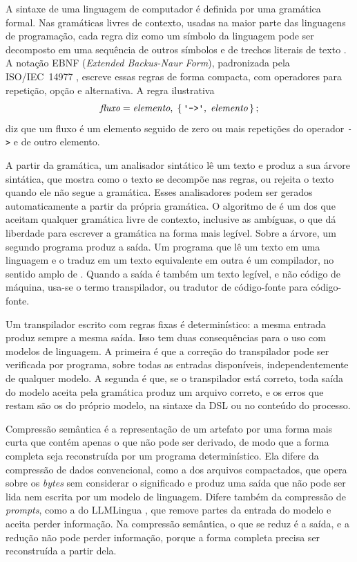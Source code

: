 A sintaxe de uma linguagem de computador é definida por uma gramática formal. Nas gramáticas livres de contexto, usadas na maior parte das linguagens de programação, cada regra diz como um símbolo da linguagem pode ser decomposto em uma sequência de outros símbolos e de trechos literais de texto \cite{aho2006compilers}. A notação EBNF (\textit{Extended Backus-Naur Form}), padronizada pela ISO/IEC~14977 \cite{iso1996ebnf}, escreve essas regras de forma compacta, com operadores para repetição, opção e alternativa. A regra ilustrativa
\begin{equation*}
	\textit{fluxo} = \textit{elemento}, \; \{\, \texttt{\textquotesingle{}->\textquotesingle{}}, \; \textit{elemento} \,\} \, ;
\end{equation*}
diz que um fluxo é um elemento seguido de zero ou mais repetições do operador \texttt{->} e de outro elemento.

A partir da gramática, um analisador sintático lê um texto e produz a sua árvore sintática, que mostra como o texto se decompõe nas regras, ou rejeita o texto quando ele não segue a gramática. Esses analisadores podem ser gerados automaticamente a partir da própria gramática. O algoritmo de  é um dos que aceitam qualquer gramática livre de contexto, inclusive as ambíguas, o que dá liberdade para escrever a gramática na forma mais legível. Sobre a árvore, um segundo programa produz a saída. Um programa que lê um texto em uma linguagem e o traduz em um texto equivalente em outra é um compilador, no sentido amplo de . Quando a saída é também um texto legível, e não código de máquina, usa-se o termo transpilador, ou tradutor de código-fonte para código-fonte.

Um transpilador escrito com regras fixas é determinístico: a mesma entrada produz sempre a mesma saída. Isso tem duas consequências para o uso com modelos de linguagem. A primeira é que a correção do transpilador pode ser verificada por programa, sobre todas as entradas disponíveis, independentemente de qualquer modelo. A segunda é que, se o transpilador está correto, toda saída do modelo aceita pela gramática produz um arquivo correto, e os erros que restam são os do próprio modelo, na sintaxe da DSL ou no conteúdo do processo.

Compressão semântica é a representação de um artefato por uma forma mais curta que contém apenas o que não pode ser derivado, de modo que a forma completa seja reconstruída por um programa determinístico. Ela difere da compressão de dados convencional, como a dos arquivos compactados, que opera sobre os \textit{bytes} sem considerar o significado e produz uma saída que não pode ser lida nem escrita por um modelo de linguagem. Difere também da compressão de \textit{prompts}, como a do LLMLingua \cite{jiang2023llmlingua}, que remove partes da entrada do modelo e aceita perder informação. Na compressão semântica, o que se reduz é a saída, e a redução não pode perder informação, porque a forma completa precisa ser reconstruída a partir dela.

